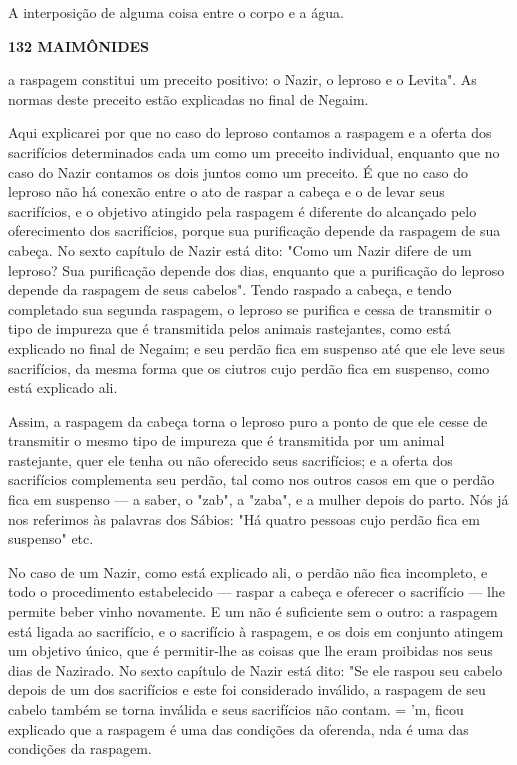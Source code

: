 \begin{itemize}
\begin{enumrate}
\begin{itemize}
\begin{itemize}
\begin{enumerate}
 A interposição de alguma coisa entre o corpo e a água.
 
\end{enumerate}


\textbf{132 MAIMÔNIDES}

a raspagem constitui um preceito positivo: o Nazir, o leproso e o
Levita". As normas deste preceito estão explicadas no final de Negaim.

Aqui explicarei por que no caso do leproso contamos a raspagem e a
oferta dos sacrifícios determinados cada um como um preceito individual,
enquanto que no caso do Nazir contamos os dois juntos como um preceito.
É que no caso do leproso não há conexão entre o ato de raspar a cabeça e
o de levar seus sacrifícios, e o objetivo atingido pela raspagem é
diferente do al­cançado pelo oferecimento dos sacrifícios, porque sua
purificação depende da raspagem de sua cabeça. No sexto capítulo de
Nazir está dito: "Como um Nazir difere de um leproso? Sua purificação
depende dos dias, enquanto que a purifi­cação do leproso depende da
raspagem de seus cabelos". Tendo raspado a ca­beça, e tendo completado
sua segunda raspagem, o leproso se purifica e cessa de transmitir o tipo
de impureza que é transmitida pelos animais rastejantes, como está
explicado no final de Negaim; e seu perdão fica em suspenso até que ele
leve seus sacrifícios, da mesma forma que os ciutros cujo perdão fica em
suspenso, como está explicado ali.

Assim, a raspagem da cabeça torna o leproso puro a ponto de que ele
cesse de transmitir o mesmo tipo de impureza que é transmitida por um
animal rastejante, quer ele tenha ou não oferecido seus sacrifícios; e a
oferta dos sacrifícios complementa seu perdão, tal como nos outros casos
em que o perdão fica em suspenso --- a saber, o "zab", a "zaba", e a
mulher depois do parto. Nós já nos referimos às palavras dos Sábios: "Há
quatro pessoas cujo per­dão fica em suspenso" etc.

No caso de um Nazir, como está explicado ali, o perdão não fica
in­completo, e todo o procedimento estabelecido --- raspar a cabeça e
oferecer o sacrifício --- lhe permite beber vinho novamente. E um não é
suficiente sem o outro: a raspagem está ligada ao sacrifício, e o
sacrifício à raspagem, e os dois em conjunto atingem um objetivo único,
que é permitir-lhe as coisas que lhe eram proibidas nos seus dias de
Nazirado. No sexto capítulo de Nazir está dito: "Se ele raspou seu
cabelo depois de um dos sacrifícios e este foi considerado inválido, a
raspagem de seu cabelo também se torna inválida e seus sacrifícios não
contam. = 'm, ficou explicado que a raspagem é uma das condições da
oferenda, nda é uma das condições da raspagem.



\end{itemize}
\end{itemize}
\end{enumrate}
\end{itemize}
